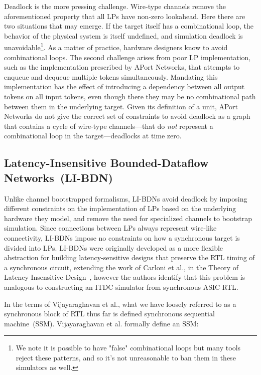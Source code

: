 Deadlock is the more pressing challenge. Wire-type channels remove the
aforementioned property that all LPs have non-zero lookahead.  Here there are
two situations that may emerge. If the target itself has a combinational loop,
the behavior of the physical system is itself undefined, and simulation
deadlock is unavoidable\footnote{We note it is possible to have "false"
combinational loops but many tools reject these patterns, and so it's not
unreasonable to ban them in these simulators as well.}. As a matter of
practice, hardware designers know to avoid combinational loops. The second
challenge arises from poor LP implementation, such as the implementation prescribed by
APort Networks, that attempts to enqueue and dequeue multiple tokens
simultaneously. Mandating this implementation has the effect of introducing a
dependency between all output tokens on all input tokens, even though there
they may be no combinational path between them in
the underlying target. Given its definition of a unit, APort Networks do not
give the correct set of constraints to avoid deadlock as a graph that contains
a cycle of wire-type channels---that do \emph{not} represent a combinational loop in
the target---deadlocks at time zero.


\subsection{Latency-Insensitive Bounded-Dataflow Networks~(LI-BDN)}

Unlike channel bootstrapped formalisms, LI-BDNs avoid deadlock by imposing
different constraints on the implementation of LPs based on the underlying
hardware they model, and remove the need for specialized channels to bootstrap
simulation. Since connections between LPs always represent wire-like
connectivity, LI-BDNs impose no constraints on how a synchronous target
is divided into LPs. LI-BDNs were originally developed as a more flexible abstraction for building
latency-sensitive designs that preserve the RTL timing of a synchronous circuit, extending
the work of Carloni et al., in the Theory of Latency Insensitive Design~\cite{TheoryOfLIDesign}, however the authors identify that this problem is analogous
to constructing an ITDC simulator from synchronous ASIC RTL.

In the terms of Vijayaraghavan et al.\cite{LIBDN}, what we have loosely referred to as a synchronous
block of RTL thus far is defined synchronous sequential machine~(SSM). Vijayaraghavan et
al.\cite{LIBDN} formally define an SSM:

